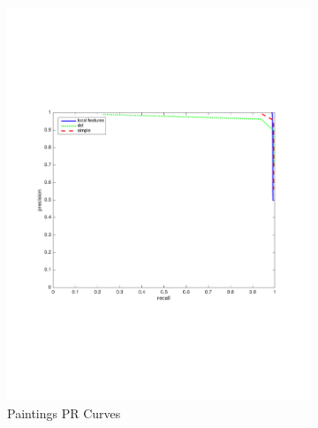 \documentclass[english,12pt,a4paper,pdftex,elec,utf8, table]{aaltothesis}
\begin{document}
\begin{figure}[htb]
\begin{center}
\begin{subfigure}[b]{0.49\textwidth}
    \includegraphics[width=\textwidth]{figures/53scalePR.pdf}
    \caption{Paintings PR Curves}
    \label{53rocthinglink}
  \end{subfigure}
  \begin{subfigure}[b]{0.49\textwidth}

\end{subfigure}
\end{center}
\end{figure}
\end{document}
